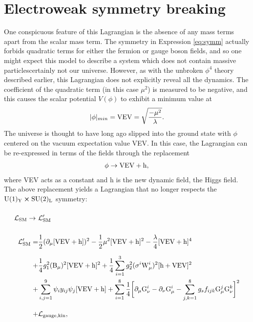 \section{Electroweak symmetry breaking}

One conspicuous feature of this Lagrangian is the absence of any mass terms apart from the scalar mass term. The symmetry in Expression \ref{eq:symm} actually forbids quadratic terms for either the fermion or gauge boson fields, and so one might expect this model to describe a system which does not contain massive particles\textemdash certainly not our universe. However, as with the unbroken $\phi^4$ theory described earlier, this Lagrangian does not explicitly reveal all the dynamics. The coefficient of the quadratic term (in this case $\mu^2$) is measured to be negative, and this causes the scalar potential $V(\phi)$ to exhibit a minimum value at
\begin{equation}
|\phi|_{min}={\rm VEV}=\sqrt{\frac{-\mu^2}{\lambda}}.
\end{equation}
The universe is thought to have long ago slipped into the ground state with $\phi$ centered on the vacuum expectation value VEV. In this case, the Lagrangian can be re-expressed in terms of the fields through the replacement
\begin{align*}
\phi\rightarrow {\rm VEV} + {\rm h}, 
\end{align*}
where VEV acts as a constant and h is the new dynamic field, the Higgs field. The above replacement yields a Lagrangian that no longer respects the $\rm U(1)_{Y}\cross\rm SU(2)_{L}$ symmetry:
\begin{align}
\setlength{\jot}{25pt}
\abovedisplayskip=-20pt
\belowdisplayskip=-20pt
\vp \Lag_{\rm SM} \rightarrow\  & \Lag_{\rm SM}'
\nonumber \\\vp 
\Lag_{\rm SM}'=& \frac{1}{2}(\partial_\mu [{\rm VEV}+{\rm h}])^2 
- \frac{1}{2}\mu^2[{\rm VEV}+{\rm h}]^{2}
-\frac{\lambda}{4}[{\rm VEV}+{\rm h}]^{4}
\nonumber \\\vp 
+&\frac{1}{4}g_{1}^{2}({\rm B}_{\mu})^2[{\rm VEV}+{\rm h}]^2 + \frac{1}{4}\sum_{i=1}^{3}g_{2}^2 (\sigma^{i} {\rm W}^{i}_{\mu})^2[{\rm h}+{\rm \vp \vp VEV}]^2 
\nonumber \\\vp +& \sum_{i,j=1}^{9}\psi_i y_{ij} \psi_{j}[{\rm VEV}+{\rm h}]
+\sum_{i=1}^{8}\frac{1}{4}\bigg[\partial_\mu {\rm G}^{i}_\nu 
- \partial_\nu {\rm G}^{i}_\mu - \sum_{j,k=1}^{8}g_s f_{ijk} {\rm G}^{j}_{\mu}{\rm G}^{k}_{\nu}\bigg]^2
\nonumber \\\vp 
+&\Lag_{\rm gauge, kin}, %
\end{align}
